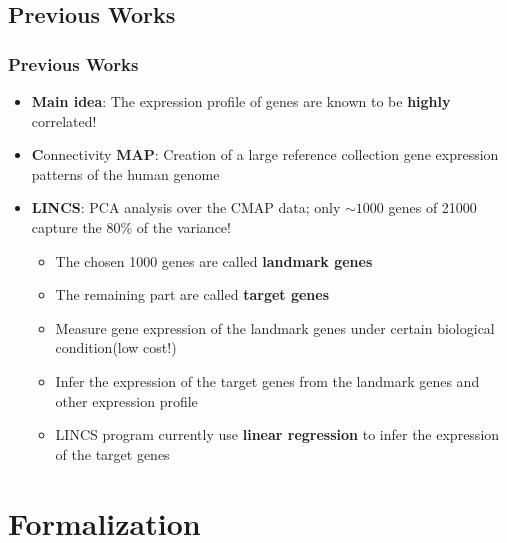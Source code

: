 \documentclass[professionalfont]{beamer}
\begin{document}
    \subsection{Previous Works}
      \begin{frame}
	\frametitle{Previous Works}
	  \begin{itemize}
	   \item \textbf{Main idea}: The expression profile of genes are known to be \textbf{highly} correlated!  
	   \item \textbf{C}onnectivity \textbf{MAP}: Creation of a large reference collection gene expression patterns of the human genome
	   \item \textbf{LINCS}: PCA analysis over the CMAP data; only $\sim 1000$ genes of 21000 capture the 80\% of the variance!
	     \begin{itemize}
	      \item The chosen 1000 genes are called \textbf{landmark genes}
	      \item The remaining part are called \textbf{target genes}
	      \item Measure gene expression of the landmark genes under certain biological condition(low cost!)
	      \item Infer the expression of the target genes from the landmark genes and other expression profile
	      \item LINCS program currently use \textbf{linear regression} to infer the expression of the target genes
	     \end{itemize}
	 \end{itemize}
      \end{frame}

    \section{Formalization}
      
\end{document}
